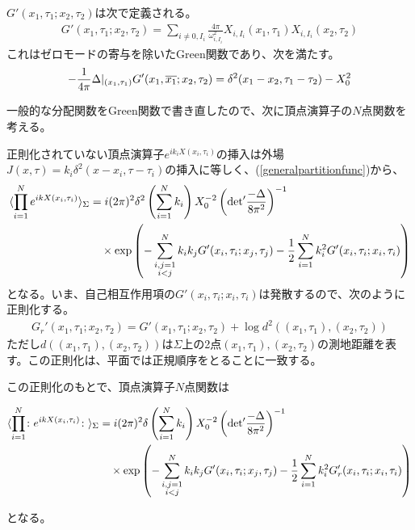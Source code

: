 $G'(x_1,\tau_1;x_2,\tau_2)$は次で定義される。
\begin{align}
G'(x_1,\tau_1;x_2,\tau_2)=\sum_{i\neq 0,I_i}\frac{4\pi}{\omega_{i,I_i}^2}X_{i,I_i}(x_1,\tau_1)X_{i,I_i}(x_2,\tau_2)
\end{align}
これはゼロモードの寄与を除いたGreen関数であり、次を満たす。
\begin{align}\label{greenfunc}
-\frac{1}{4\pi}\Delta|_{(x_1,\tau_1)}G'(x_1,\overline{x_1};x_2,\tau_2)=\delta^2(x_1-x_2,\tau_1-\tau_2)-X_0^2 
\end{align}

一般的な分配関数をGreen関数で書き直したので、次に頂点演算子の$N$点関数を考える。

正則化されていない頂点演算子$e^{ik_i X(x_i,\tau_i)}$の挿入は外場$J(x,\tau)=k_i \delta^2(x-x_i,\tau-\tau_i)$の挿入に等しく、(\ref{generalpartitionfunc})から、
\begin{align}
\langle \prod_{i=1}^{N} e^{ikX(x_i,\tau_i)} \rangle_\Sigma&=i(2\pi)^2\delta^2\left(\sum_{i=1}^{N}k_i \right)X_0^{-2}\left(\text{det}' \frac{-\Delta}{8\pi^2} \right)^{-1}\notag\\
&\quad \times \exp\left( -\sum_{\substack{i,j=1\\i<j}}^{N}k_i k_j G'(x_i,\tau_i;x_j,\tau_j)-\frac{1}{2}\sum_{i=1}^{N}k_i^2 G'(x_i,\tau_i;x_i,\tau_i) \right)
\end{align}
となる。いま、自己相互作用項の$G'(x_i,\tau_i;x_i,\tau_i)$は発散するので、次のように正則化する。
\begin{align}
G_r'(x_1,\tau_1;x_2,\tau_2)=G'(x_1,\tau_1;x_2,\tau_2)+\log d^2((x_1,\tau_1),(x_2,\tau_2))
\end{align}
ただし$d((x_1,\tau_1),(x_2,\tau_2))$は$\Sigma$上の2点$(x_1,\tau_1),(x_2,\tau_2)$の測地距離を表す。この正則化は、平面では正規順序をとることに一致する。

この正則化のもとで、頂点演算子$N$点関数は
\begin{oframed}
\begin{align}\label{vertexnptfunc}
\langle \prod_{i=1}^{N} \colon e^{ikX(x_i,\tau_i)}\colon  \rangle_\Sigma&=i(2\pi)^2\delta\left(\sum_{i=1}^{N}k_i \right)X_0^{-2}\left(\text{det}' \frac{-\Delta}{8\pi^2} \right)^{-1}\notag\\
&\quad \times \exp\left( -\sum_{\substack{i,j=1\\i<j}}^{N}k_i k_j G'(x_i,\tau_i;x_j,\tau_j)-\frac{1}{2}\sum_{i=1}^{N}k_i^2 G_r'(x_i,\tau_i;x_i,\tau_i) \right)
\end{align}
\end{oframed}
となる。

